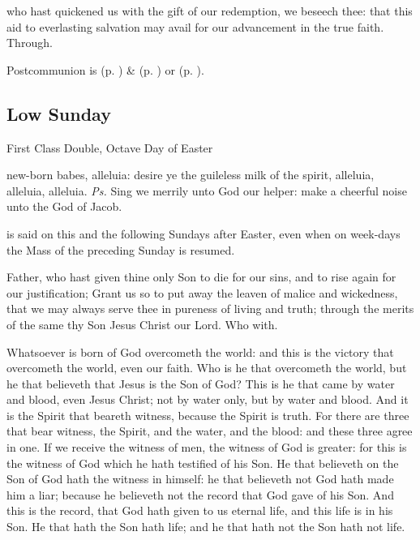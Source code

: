 \postcommunion
{} who hast quickened us with the gift of our redemption, we beseech thee: that this aid to everlasting salvation may avail for our advancement in the true faith. Through.
\begin{rubric}
     Postcommunion is  (p. \pageref{EasterPostcommunion}) \&   (p. \pageref{SPAgainst}) or  (p. \pageref{SPChiefBishop}).
\end{rubric}


\subsection{Low Sunday}
\begin{inhead}
    {First Class Double, Octave Day of Easter}
\end{inhead}


\introit
{} new-born babes, alleluia: desire ye the guileless milk of the spirit, alleluia, alleluia, alleluia. \textit{Ps.} Sing we merrily unto God our helper: make a cheerful noise unto the God of Jacob.
\begin{rubric}
     is said on this and the following Sundays after Easter, even when on week-days the Mass of the preceding Sunday is resumed.
\end{rubric}
\collect
{} Father, who hast given thine only Son to die for our sins, and to rise again for our justification; Grant us so to put away the leaven of malice and wickedness, that we may always serve thee in pureness of living and truth; through the merits of the same thy Son Jesus Christ our Lord. Who with.

 Whatsoever is born of God overcometh the world: and this is the victory that overcometh the world, even our faith. Who is he that overcometh the world, but he that believeth that Jesus is the Son of God? This is he that came by water and blood, even Jesus Christ; not by water only, but by water and blood. And it is the Spirit that beareth witness, because the Spirit is truth. For there are three that bear witness, the Spirit, and the water, and the blood: and these three agree in one. If we receive the witness of men, the witness of God is greater: for this is the witness of God which he hath testified of his Son. He that believeth on the Son of God hath the witness in himself: he that believeth not God hath made him a liar; because he believeth not the record that God gave of his Son. And this is the record, that God hath given to us eternal life, and this life is in his Son. He that hath the Son hath life; and he that hath not the Son hath not life.

